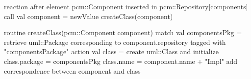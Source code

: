 reaction {
	after element pcm::Component inserted in pcm::Repository[components]
	call {
		val component = newValue
		createClass(component)
	}
}

routine createClass(pcm::Component component) {
	match {
		val componentsPkg = retrieve uml::Package
			corresponding to component.repository
			tagged with "componentsPackage"
	}
	action {
		val class = create uml::Class and initialize {
			class.package = componentsPkg
			class.name = component.name + "Impl"
		}
		add correspondence between component and class
	}
}